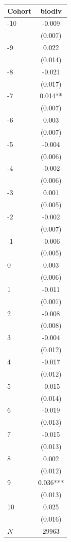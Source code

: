 {
\def\sym#1{\ifmmode^{#1}\else\(^{#1}\)\fi}
\begin{tabular}{l*{1}{c}}
\toprule
Cohort    &   biodiv   \\
\midrule
-10       &   -0.009   \\
          &  (0.007)   \\
-9        &    0.022   \\
          &  (0.014)   \\
-8        &   -0.021   \\
          &  (0.017)   \\
-7        &    0.014** \\
          &  (0.007)   \\
-6        &    0.003   \\
          &  (0.007)   \\
-5        &   -0.004   \\
          &  (0.006)   \\
-4        &   -0.002   \\
          &  (0.006)   \\
-3        &    0.001   \\
          &  (0.005)   \\
-2        &   -0.002   \\
          &  (0.007)   \\
-1        &   -0.006   \\
          &  (0.005)   \\
0         &    0.003   \\
          &  (0.006)   \\
1         &   -0.011   \\
          &  (0.007)   \\
2         &   -0.008   \\
          &  (0.008)   \\
3         &   -0.004   \\
          &  (0.012)   \\
4         &   -0.017   \\
          &  (0.012)   \\
5         &   -0.015   \\
          &  (0.014)   \\
6         &   -0.019   \\
          &  (0.013)   \\
7         &   -0.015   \\
          &  (0.013)   \\
8         &    0.002   \\
          &  (0.012)   \\
9         &    0.036***\\
          &  (0.013)   \\
10        &    0.025   \\
          &  (0.016)   \\
\midrule
\(N\)     &    29963   \\
\bottomrule
\end{tabular}
}

